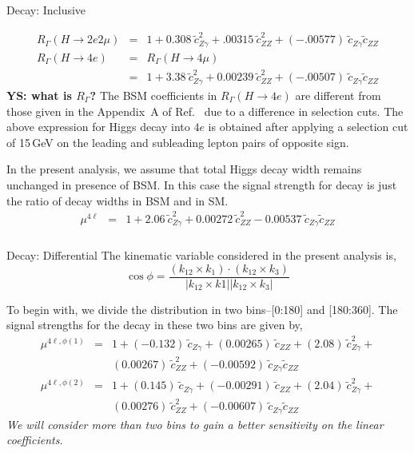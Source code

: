 \documentclass[../report.tex]{subfiles}
\begin{document}
\subsubsection*{}{Decay: Inclusive}

\begin{eqnarray}
 R_{\Gamma}(H \to 2e2\mu) &=& 1  + 0.308~ {\tilde c}_{Z\gamma}^2 + .00315~ {\tilde c}_{ZZ}^2
   + (-.00577)~{\tilde c}_{Z\gamma}{\tilde c}_{ZZ} \\
 R_{\Gamma}(H \to 4e)
 &=& R_{\Gamma}(H \to 4\mu) \nonumber \\
 &=& 1  + 3.38~ {\tilde c}_{Z\gamma}^2 + 0.00239~ {\tilde c}_{ZZ}^2
   + (-.00507)~{\tilde c}_{Z\gamma}{\tilde c}_{ZZ}
\end{eqnarray}
{\bf YS: what is $R_\Gamma$?}
The BSM coefficients in $R_{\Gamma}(H \to 4e)$ are different from those given in the Appendix~A of
Ref.~\cite{Boselli:2017pef} due to a difference in selection cuts. The above expression for Higgs decay
into $4e$ is obtained after applying a selection cut of 15\,GeV on the leading and subleading lepton pairs
of opposite sign.

In the present analysis, we assume that total Higgs decay width remains unchanged in presence of BSM. In this
case the signal strength for decay is just the ratio of decay widths in BSM and in SM.
%
\begin{eqnarray}
 \mu^{4\ell} &=& 1  + 2.06~ {\tilde c}_{Z\gamma}^2 +
 0.00272~ {\tilde c}_{ZZ}^2  -
 0.00537~ {\tilde c}_{Z\gamma} {\tilde c}_{ZZ}
\end{eqnarray}
%
\subsubsection*{}{Decay: Differential}
The kinematic variable considered in the present analysis is,
\begin{equation}
        \cos \phi =
        \frac{\left( k_{12} \times k_1\right) \cdot \left( k_{12} \times k_3 \right)}
        {\left| k_{12} \times k1 \right| \left| k_{12} × k_3 \right|}
\end{equation}


To begin with, we divide the distribution in two bins--[0:180] and [180:360]. The signal strengths for the decay in these two bins
are given by,
%
\begin{eqnarray}
 \mu^{4\ell,\phi(1)} &=& 1 +  (-0.132)~{\tilde c}_{Z\gamma} +
  (0.00265)~{\tilde c}_{ZZ}  +  (2.08)~{\tilde c}_{Z\gamma}^2  + \nonumber \\ &&
  (0.00267)~{\tilde c}_{ZZ}^2 +
  (-0.00592)~{\tilde c}_{Z\gamma} {\tilde c}_{ZZ}
\end{eqnarray}
%
\begin{eqnarray}
 \mu^{4\ell,\phi(2)} &=& 1 + (0.145)~ {\tilde c}_{Z\gamma} +
  (-0.00291)~{\tilde c}_{ZZ}  +  (2.04)~{\tilde c}_{Z\gamma}^2 + \nonumber \\ &&
  (0.00276)~{\tilde c}_{ZZ}^2 +
  (-0.00607)~{\tilde c}_{Z\gamma} {\tilde c}_{ZZ}
\end{eqnarray}
%
{\it We will consider more than two bins to gain a better sensitivity on the linear coefficients.}
\end{document}
